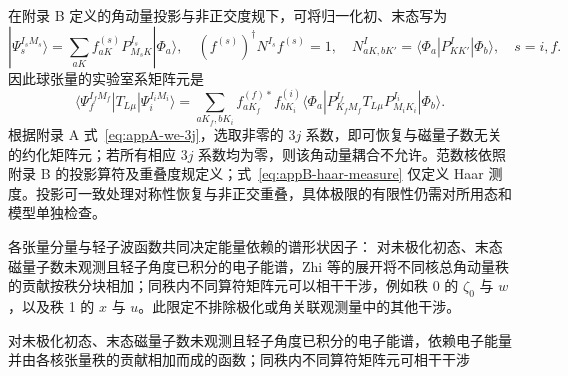 在附录 B 定义的角动量投影与非正交度规下，可将归一化初、末态写为
\[
|\Psi_s^{I_sM_s}\rangle=\sum_{aK}f^{(s)}_{aK}P^{I_s}_{M_sK}|\Phi_a\rangle,
\quad (f^{(s)})^\dagger N^{I_s} f^{(s)}=1,\quad
N^I_{aK,bK'}=\langle\Phi_a|P^I_{KK'}|\Phi_b\rangle,\quad s=i,f.
\]
因此球张量的实验室系矩阵元是
\[
\langle\Psi_f^{I_fM_f}|T_{L\mu}|\Psi_i^{I_iM_i}\rangle
=\sum_{aK_f,bK_i}f^{(f)*}_{aK_f}f^{(i)}_{bK_i}
\langle\Phi_a|P^{I_f}_{K_fM_f}T_{L\mu}P^{I_i}_{M_iK_i}|\Phi_b\rangle.
\]
根据附录 A 式~\eqref{eq:appA-we-3j}，选取非零的 $3j$ 系数，即可恢复与磁量子数无关的约化矩阵元；若所有相应 $3j$ 系数均为零，则该角动量耦合不允许。范数核依照附录 B 的投影算符及重叠度规定义；式~\eqref{eq:appB-haar-measure} 仅定义 Haar 测度。投影可一致处理对称性恢复与非正交重叠，具体极限的有限性仍需对所用态和模型单独检查。

各张量分量与轻子波函数共同决定能量依赖的谱形状因子：
对未极化初态、末态磁量子数未观测且轻子角度已积分的电子能谱，Zhi 等的展开将不同核总角动量秩的贡献按秩分块相加；同秩内不同算符矩阵元可以相干干涉，例如秩 0 的 $\zeta_0$ 与 $w$，以及秩 1 的 $x$ 与 $u$。此限定不排除极化或角关联观测量中的其他干涉。

对未极化初态、末态磁量子数未观测且轻子角度已积分的电子能谱，依赖电子能量并由各核张量秩的贡献相加而成的函数；同秩内不同算符矩阵元可相干干涉

